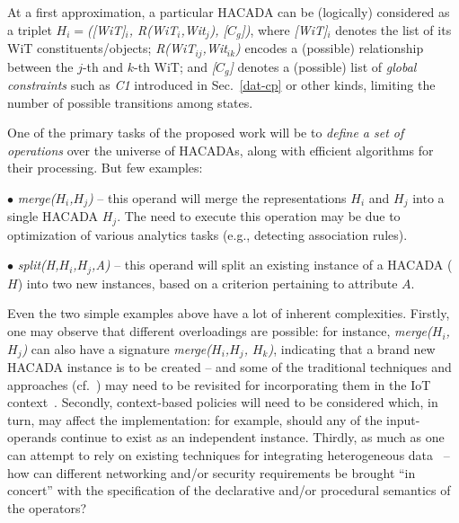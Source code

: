 At a first approximation, a particular HACADA can be (logically) considered as a triplet $H_i =${\it ([WiT]$_i$, R(WiT$_i$,Wit$_j$), [$C_g$])}, where {\it [WiT]$_i$} denotes the list of its WiT constituents/objects; {\it R(WiT$_{ij}$,Wit$_{ik}$)} encodes a (possible) relationship  between the $j$-th and $k$-th WiT; and {\it [$C_g$]} denotes a (possible) list of {\it global constraints} such as {\it C1} introduced in Sec.~\ref{dat-cp} or other kinds, limiting the number of possible transitions among states.

One of the primary tasks of the proposed work will be to {\it define a set of operations} over the universe of HACADAs, along with efficient algorithms for their processing. But few examples:

\noindent $\bullet$ {\it merge($H_i$,$H_j$)} -- this operand will merge the representations $H_i$ and $H_j$ into a single HACADA $H_j$. The need to execute this operation may be due to optimization of various analytics tasks (e.g., detecting association rules).

\noindent $\bullet$ {\it split(H,$H_i$,$H_j$,A)} -- this operand will split an existing instance of a HACADA ($H$) into two new instances, based on a criterion pertaining to attribute $A$.

Even the two simple examples above have a lot of inherent complexities. Firstly, one may observe that different overloadings are possible: for instance, {\it merge($H_i$,$H_j$)} can also have a signature {\it merge($H_i$,$H_j$, $H_k$)}, indicating that a brand new HACADA instance is to be created -- and some of the traditional techniques and approaches (cf.~\cite{GoguenM92,JouannaudKKM92}) may need to be revisited for incorporating them in the IoT context~\cite{Adaikkalavan05,snoop11}. Secondly, context-based policies will need to be considered which, in turn, may affect the implementation: for example, should any of the input-operands continue to exist as an independent instance. Thirdly, as much as one can attempt to rely on existing techniques for integrating heterogeneous data~\cite{BergamaschiCVB01,Cohen98,CouletGDAMS11,HalevyRO06,SalarianCN12} -- how can different networking and/or security requirements be brought ``in concert'' with the specification of the declarative and/or procedural semantics of the operators?

